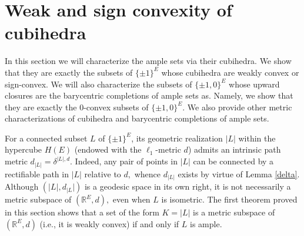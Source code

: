 \documentclass[11pt,a4paper]{amsart}
\theoremstyle{definition}
\numberwithin{equation}{section}
\newcommand{\covectors}{\ensuremath{L}}
\newcommand{\HH}{\ensuremath{H}}
\begin{document}

\section{Weak and sign convexity of cubihedra}\label{metric-characterization}

In this section we will characterize the ample sets via their cubihedra. We show that they are exactly the subsets of $\{ \pm 1\}^E$ whose cubihedra are weakly convex or sign-convex. We will also characterize the subsets of $\{\pm 1, 0\}^E$ whose upward closures are the barycentric completions of ample sets as. Namely, we show that they are exactly  the 0-convex subsets of $\{\pm 1, 0\}^E$. We also provide other metric characterizations of cubihedra  and barycentric completions of ample sets.

For a connected subset $\covectors$ of $\{ \pm 1\}^E$, its geometric realization $|\covectors|$ within the hypercube ${\HH}(E)$
(endowed with the $\ell_1$-metric $d$) admits an intrinsic path metric $d_{|\covectors|}=\delta^{|\covectors|,d}$.  Indeed, any pair of points in $|\covectors|$ can be connected by a rectifiable path in $|\covectors|$ relative to $d,$ whence $d_{|\covectors|}$ exists by
virtue of Lemma \ref{delta}. Although $(|\covectors|,d_{|\covectors}|)$ is a geodesic space in its own right, it is not necessarily a metric subspace of
$({\mathbb R}^E,d),$ even when $\covectors$ is isometric. %
The first theorem proved in this section shows that a set of the form $K=|\covectors|$ is a metric subspace of $({\mathbb R}^E,d)$ (i.e., it is weakly convex) if and only if $L$ is ample.
\end{document}
